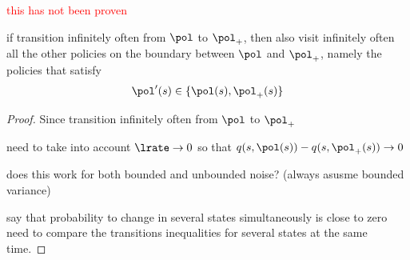 \begin{lemma}
\label{thm: visit all policies around boundary}
\textcolor{red}{this has not been proven}

    if transition infinitely often from $\pol$ to $\pol_+$, then also visit infinitely often all the other policies on the boundary between $\pol$ and $\pol_+$, namely the policies that satisfy
    \begin{align}
        \pol'(s) \in \{\pol(s), \pol_+(s)\}
    \end{align}
\end{lemma}
\begin{proof}
    Since transition infinitely often from $\pol$ to $\pol_+$
    
    need to take into account $\lrate \to 0$ so that $q(s, \pol(s)) - q(s, \pol_+(s)) \to 0$
    
    does this work for both bounded and unbounded noise? (always asusme bounded variance)
    
    say that probability to change in several states simultaneously is close to zero
    need to compare the transitions inequalities for several states at the same time.
\end{proof}